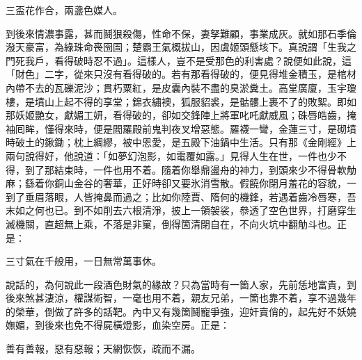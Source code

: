 三盃花作合，兩盞色媒人。

到後來情濃事露，甚而鬪狠殺傷，{}性命不保，妻孥難顧，事業成灰。就如那石季倫潑天豪富，為綠珠命䘮囹圄；楚霸王氣概拔山，因虞姬頭懸垓下。真說謂「生我之門死我戶，看得破時忍不過」。這樣人，豈不是受那色的利害處？說便如此說，這「財色」二字，從來只沒有看得破的。{}若有那看得破的，便見得堆金積玉，是棺材內帶不去的瓦礫泥沙；貫朽粟紅，是皮囊內裝不盡的臭淤糞土。高堂廣廈，玉宇瓊樓，是墳山上起不得的享堂；錦衣繡襖，狐服貂裘，是骷髏上裹不了的敗絮。即如那妖姬艷女，獻媚工妍，看得破的，卻如交鋒陣上將軍叱吒獻威風；硃唇皓齒，掩袖囘眸，懂得來時，便是閻羅殿前鬼判夜叉增惡態。羅襪一彎，金蓮三寸，是砌墳時破土的鍬鋤；{}枕上綢繆，被中恩愛，是五殿下油鍋中生活。只有那《金剛經》上兩句說得好，他說道：「如夢幻泡影，如電覆如露。」見得人生在世，一件也少不得，到了那結束時，一件也用不着。隨着你舉鼎盪舟的神力，到頭來少不得骨軟觔麻；繇着你銅山金谷的奢華，正好時卻又要氷消雪散。假饒你閉月羞花的容貌，一到了垂眉落眼，人皆掩鼻而過之；比如你陸賈、隋何的機鋒，若遇着齒冷唇寒，吾末如之何也已。{}到不如削去六根清淨，{}披上一領袈裟，叅透了空色世界，打磨穿生滅機關，直超無上乘，不落是非窠，倒得箇清閉自在，不向火坑中翻觔斗也。正是：

三寸氣在千般用，一日無常萬事休。

說話的，為何說此一段酒色財氣的緣故？只為當時有一箇人家，先前恁地富貴，到後來煞甚淒涼，權謀術智，一毫也用不着，親友兄弟，一箇也靠不着，享不過幾年的榮華，倒做了許多的話靶。內中又有幾箇鬪寵爭強，迎奸賣俏的，起先好不妖嬈嫵媚，到後來也免不得屍橫燈影，血染空房。正是：

善有善報，惡有惡報；天網恢恢，疏而不漏。

